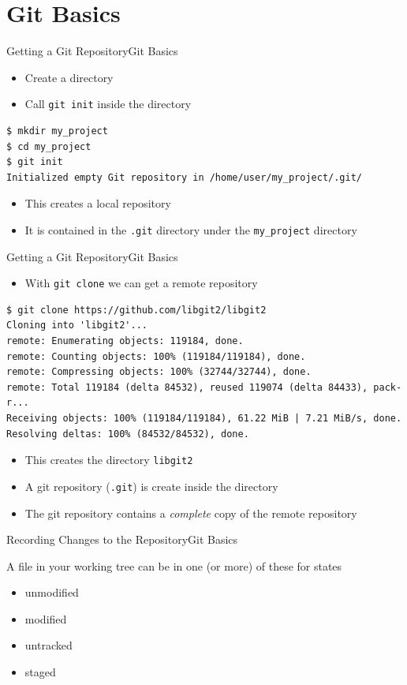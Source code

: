 \documentclass[aspectratio=169]{beamer}
\newcommand{\sectiontitle}{}
\newcommand{\newsection}[1]{\renewcommand{\sectiontitle}{#1}\section{#1}}
\begin{document}
\newsection{Git Basics}
\begin{frame}[fragile]{Getting a Git Repository}{\sectiontitle}
\begin{itemize}
    \item Create a directory
    \item Call \verb|git init| inside the directory
\end{itemize}
\begin{verbatim}
$ mkdir my_project
$ cd my_project
$ git init
Initialized empty Git repository in /home/user/my_project/.git/
\end{verbatim}
\begin{itemize}
    \item This creates a local repository
    \item It is contained in the \verb|.git| directory under the \verb|my_project| directory
\end{itemize}
\end{frame}

\begin{frame}[fragile]{Getting a Git Repository}{\sectiontitle}
\begin{itemize}
    \item With \verb|git clone| we can get a remote repository
\end{itemize}
\begin{verbatim}
$ git clone https://github.com/libgit2/libgit2
Cloning into 'libgit2'...
remote: Enumerating objects: 119184, done.
remote: Counting objects: 100% (119184/119184), done.
remote: Compressing objects: 100% (32744/32744), done.
remote: Total 119184 (delta 84532), reused 119074 (delta 84433), pack-r...
Receiving objects: 100% (119184/119184), 61.22 MiB | 7.21 MiB/s, done.
Resolving deltas: 100% (84532/84532), done.
\end{verbatim}
\begin{itemize}
    \item This creates the directory \verb|libgit2|
    \item A git repository (\verb|.git|) is create inside the directory
    \item The git repository contains a \emph{complete} copy of the remote repository
\end{itemize}
\end{frame}

\begin{frame}{Recording Changes to the Repository}{\sectiontitle}
\begin{block}{A file in your working tree can be in one (or more) of these for states}
    \begin{itemize}
        \item unmodified
        \item modified
        \item untracked
        \item staged
    \end{itemize}
\end{block}
\end{frame}
\end{document}
